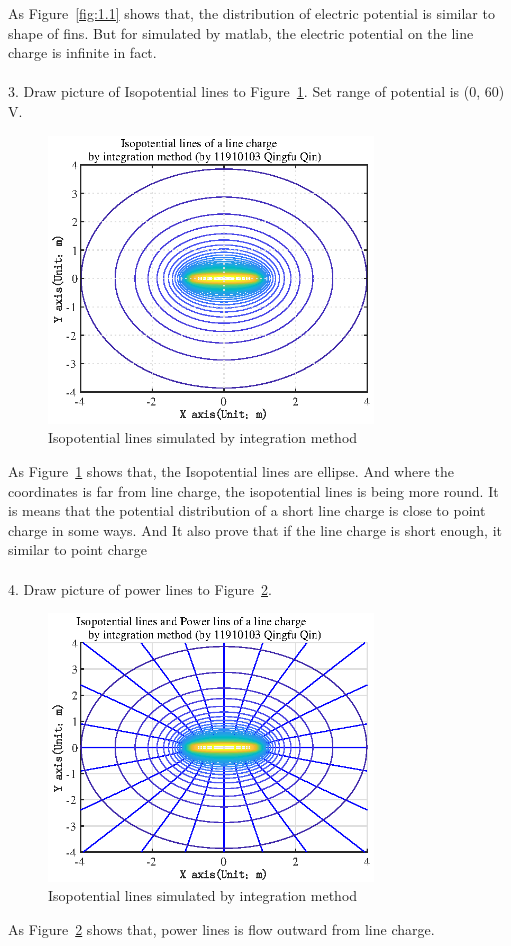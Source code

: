 \documentclass[10pt, journal, final]{IEEEtran}
\begin{document}
As Figure~\ref{fig:1.1} shows that,
the distribution of electric potential is similar to shape of fins.
But for simulated by matlab,
the electric potential on the line charge is infinite in fact.\\
\\
3. Draw picture of Isopotential lines to Figure~\ref{fig:1.2}.
Set range of potential is (0, 60) V.

\label{work1.3}
\begin{figure}[htbp]
    \centering
    \includegraphics[width = 3.4in]{figures/fig1.2.eps}
    \caption{Isopotential lines simulated by integration method}
    \label{fig:1.2}
\end{figure}
As Figure~\ref{fig:1.2} shows that, the Isopotential lines are ellipse.
And where the coordinates is far from line charge, the isopotential lines is being more round.
It is means that the potential distribution of a short line charge
is close to point charge in some ways.
And It also prove that if the line charge is short enough, it similar to point charge\\
\\
4. Draw picture of power lines to Figure~\ref{fig:1.3}.

\label{work1.4}
\begin{figure}[htbp]
    \centering
    \includegraphics[width = 3.4in]{figures/fig1.3.eps}
    \caption{Isopotential lines simulated by integration method}
    \label{fig:1.3}
\end{figure}
As Figure~\ref{fig:1.3} shows that, power lines is flow outward from line charge.
\end{document}
